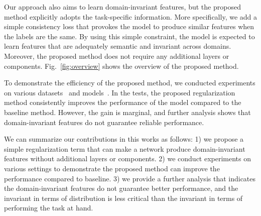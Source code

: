 Our approach also aims to learn domain-invariant features, but the proposed method explicitly adopts the task-specific information. More specifically, we add a simple consistency loss that provokes the model to produce similar features when the labels are the same. By using this simple constraint, the model is expected to learn features that are adequately semantic and invariant across domains. Moreover, the proposed method does not require any additional layers or components. Fig.~\ref{fig:overview} shows the overview of the proposed method.

To demonstrate the efficiency of the proposed method, we conducted experiments on various datasets~\cite{chen2013vlcs, Li2017dg} and models~\cite{He2016resnet, Krizhevsky2012}. In the tests, the proposed regularization method consistently improves the performance of the model compared to the baseline method. However, the gain is marginal, and further analysis shows that domain-invariant features do not guarantee reliable performance.

We can summarize our contributions in this works as follows: 1) we propose a simple regularization term that can make a network produce domain-invariant features without additional layers or components. 2) we conduct experiments on various settings to demonstrate the proposed method can improve the performance compared to baseline. 3) we provide a further analysis that indicates the domain-invariant features do not guarantee better performance, and the invariant in terms of distribution is less critical than the invariant in terms of performing the task at hand. 

